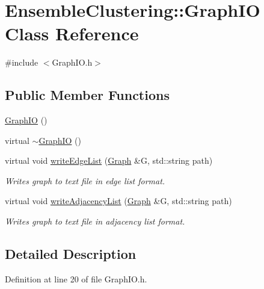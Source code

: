 \hypertarget{class_ensemble_clustering_1_1_graph_i_o}{\section{Ensemble\-Clustering\-:\-:Graph\-I\-O Class Reference}
\label{class_ensemble_clustering_1_1_graph_i_o}
}


{\ttfamily \#include $<$Graph\-I\-O.\-h$>$}

\subsection*{Public Member Functions}
\begin{DoxyCompactItemize}
\item 
\hyperlink{class_ensemble_clustering_1_1_graph_i_o_a7facb3dd59b61c170b732cb006626e00}{Graph\-I\-O} ()
\item 
virtual \hyperlink{class_ensemble_clustering_1_1_graph_i_o_a05713f5e4b56a6ed0aeb37e653ad6d6e}{$\sim$\-Graph\-I\-O} ()
\item 
virtual void \hyperlink{class_ensemble_clustering_1_1_graph_i_o_ac0ebb5ee826cf649bf3a6d821c3d6bc4}{write\-Edge\-List} (\hyperlink{class_ensemble_clustering_1_1_graph}{Graph} \&G, std\-::string path)
\begin{DoxyCompactList}\small\item\em Writes graph to text file in edge list format. \end{DoxyCompactList}\item 
virtual void \hyperlink{class_ensemble_clustering_1_1_graph_i_o_aa31e284a79283a18153b40e34f417e7c}{write\-Adjacency\-List} (\hyperlink{class_ensemble_clustering_1_1_graph}{Graph} \&G, std\-::string path)
\begin{DoxyCompactList}\small\item\em Writes graph to text file in adjacency list format. \end{DoxyCompactList}\end{DoxyCompactItemize}


\subsection{Detailed Description}


Definition at line 20 of file Graph\-I\-O.\-h.



